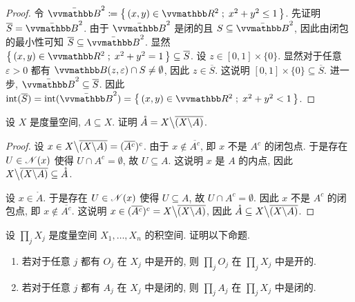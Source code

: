 \begin{proof}
    令 \(\bar \B^2 \coloneqq \bigl\{\, (x, y) \in \R^2 \;;\; x^2 + y^2 \leq 1 \,\bigr\}\). 先证明 \(\overline S = \bar \B^2\). 由于 \(\bar \B^2\) 是闭的且 \(S \subseteq \bar \B^2\), 因此由闭包的最小性可知 \(\overline S \subseteq \bar \B^2\). 显然 \(\bigl\{\, (x, y) \in \R^2 \;;\; x^2 + y^2 = 1 \,\bigr\} \subseteq \overline S\). 设 \(z \in [0, 1] \times \{0\}\). 显然对于任意 \(\varepsilon > 0\) 都有 \(\B(z, \varepsilon) \cap S \neq \emptyset\), 因此 \(z \in \overline S\). 这说明 \([0, 1] \times \{0\} \subseteq \overline S\). 进一步, \(\bar \B^2 \subseteq \overline S\). 因此 \(\interior(\overline S) = \interior(\bar \B^2) = \bigl\{\, (x, y) \in \R^2 \;;\; x^2 + y^2 < 1 \,\bigr\}\).
\end{proof}

\begin{exercise}
    设 \(X\) 是度量空间, \(A \subseteq X\). 证明 \(\mathring A = X \big\backslash \overline{(X \backslash A)}\).
\end{exercise}

\begin{proof}
    设 \(x \in X \big\backslash \overline{(X \backslash A)} = (\overline{A^c})^c\). 由于 \(x \notin \overline{A^c}\), 即 \(x\) 不是 \(A^c\) 的闭包点. 于是存在 \(U \in \mathscr N(x)\) 使得 \(U \cap A^c = \emptyset\), 故 \(U \subseteq A\). 这说明 \(x\) 是 \(A\) 的内点, 因此 \(X \big\backslash \overline{(X \backslash A)} \subseteq \mathring A\).

    设 \(x \in \mathring A\). 于是存在 \(U \in \mathscr N(x)\) 使得 \(U \subseteq A\), 故 \(U \cap A^c = \emptyset\). 因此 \(x\) 不是 \(A^c\) 的闭包点, 即 \(x \notin \overline{A^c}\). 这说明 \(x \in (\overline{A^c})^c = X \big\backslash \overline{(X \backslash A)}\), 因此 \(\mathring A \subseteq X \big\backslash \overline{(X \backslash A)}\).
\end{proof}

\begin{exercise}
    设 \(\prod_j X_j\) 是度量空间 \(X_1, \ldots, X_n\) 的积空间. 证明以下命题.
    \begin{enumerate}
        \item 若对于任意 \(j\) 都有 \(O_j\) 在 \(X_j\) 中是开的, 则 \(\prod_j O_j\) 在 \(\prod_j X_j\) 中是开的.
        \item 若对于任意 \(j\) 都有 \(A_j\) 在 \(X_j\) 中是闭的, 则 \(\prod_j A_j\) 在 \(\prod_j X_j\) 中是闭的.
    \end{enumerate}
\end{exercise}

